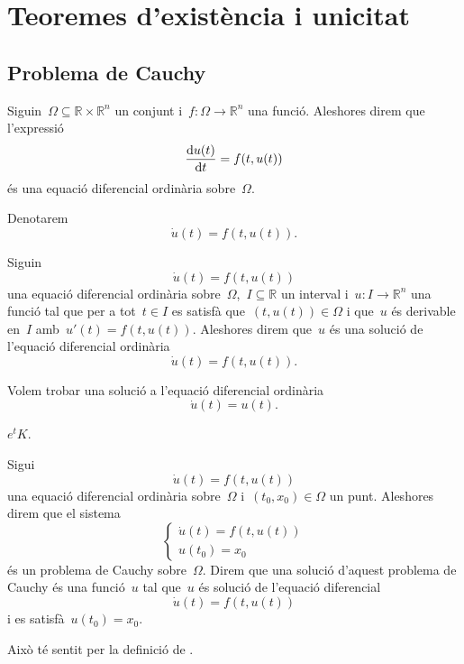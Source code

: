 \documentclass[../../main.tex]{subfiles}
\begin{document}
\section{Teoremes d'existència i unicitat}
	\subsection{Problema de Cauchy}
	\begin{definition}
		\label{def:equació diferencial ordinària}
		Siguin~\(\Omega\subseteq\mathbb{R}\times\mathbb{R}^{n}\) un conjunt i~\(f\colon\Omega\longrightarrow\mathbb{R}^{n}\) una funció.
		Aleshores direm que l'expressió
		\[
		    \frac{\mathop{}\!\mathrm{d} u(t)}{\mathop{}\!\mathrm{d} t}=f(t,u(t))
		\]
		és una equació diferencial ordinària sobre~\(\Omega\).

		Denotarem
		\[
		    \dot{u}(t)=f(t,u(t)).
		\]
	\end{definition}
	\begin{definition}
		\label{def:solució d'una equació diferencial ordinària}
		Siguin
		\[
		    \dot{u}(t)=f(t,u(t))
		\]
		una equació diferencial ordinària sobre~\(\Omega\),~\(I\subseteq\mathbb{R}\) un interval i~\(u\colon I\longrightarrow\mathbb{R}^{n}\) una funció tal que per a tot~\(t\in I\) es satisfà que~\((t,u(t))\in\Omega\) i que~\(u\) és derivable en~\(I\) amb~\(u'(t)=f(t,u(t))\).
		Aleshores direm que~\(u\) és una solució de l'equació diferencial ordinària
		\[
		    \dot{u}(t)=f(t,u(t)).
		\]
	\end{definition}
	\begin{example}
		\label{ex:exemple d'una equació diferencial 1}
		\label{ex:exemple edos de la exponencial}
		Volem trobar una solució a l'equació diferencial ordinària
		\[
		    \dot{u}(t)=u(t).
		\]
		\begin{solution}
			\(e^{t}K\).
		\end{solution}
	\end{example}
	\begin{definition}
		\label{def:problema de Cauchy}
		\label{def:solució d'un problema de Cauchy}
		Sigui
		\[
		    \dot{u}(t)=f(t,u(t))
		\]
		una equació diferencial ordinària sobre~\(\Omega\) i~\((t_{0},x_{0})\in\Omega\) un punt.
		Aleshores direm que el sistema
		\[\begin{cases*}
			\displaystyle \dot{u}(t)=f(t,u(t)) \\
			\displaystyle u(t_{0})=x_{0}
		\end{cases*}\]
		és un problema de Cauchy sobre~\(\Omega\).
		Direm que una solució d'aquest problema de Cauchy és una funció~\(u\) tal que~\(u\) és solució de l'equació diferencial
		\[
		    \dot{u}(t)=f(t,u(t))
		\]
		i es satisfà~\(u(t_{0})=x_{0}\).

		Això té sentit per la definició de .
	\end{definition}
\end{document}
